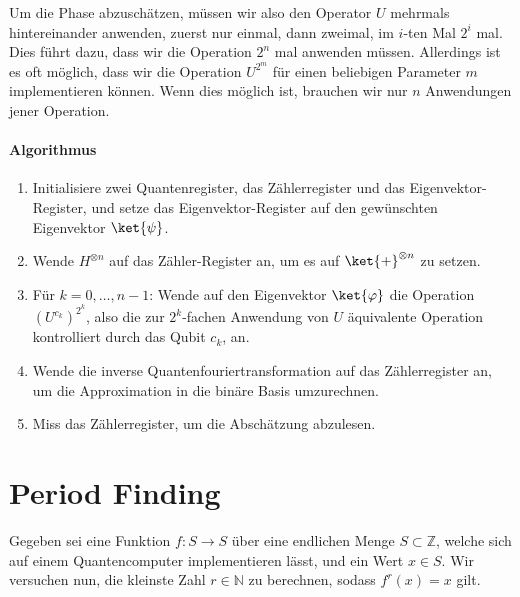 Um die Phase abzuschätzen, müssen wir also den Operator $U$ mehrmals hintereinander anwenden, zuerst nur einmal, dann zweimal, im $i$-ten Mal $2^i$ mal. Dies führt dazu, dass wir die Operation $2^n$ mal anwenden müssen. Allerdings ist es oft möglich, dass wir die Operation $U^{2^m}$ für einen beliebigen Parameter $m$ implementieren können. Wenn dies möglich ist, brauchen wir nur $n$ Anwendungen jener Operation.

\paragraph{Algorithmus}
\begin{enumerate}
    \item Initialisiere zwei Quantenregister, das Zählerregister und das Eigenvektor-Register, und setze das Eigenvektor-Register auf den gewünschten Eigenvektor $\ket{\psi}$.
    \item Wende $H^{\otimes n}$ auf das Zähler-Register an, um es auf $\ket{+}^{\otimes n}$ zu setzen.
    \item Für $k = 0, \dots, n - 1$: Wende auf den Eigenvektor $\ket{\varphi}$ die Operation $(U^{c_k})^{2^k}$, also die zur $2^k$-fachen Anwendung von $U$ äquivalente Operation kontrolliert durch das Qubit $c_k$, an.
    \item Wende die inverse Quantenfouriertransformation auf das Zählerregister an, um die Approximation in die binäre Basis umzurechnen.
    \item Miss das Zählerregister, um die Abschätzung abzulesen.
\end{enumerate}
\paragraph{}

\paragraph{}

\section{Period Finding}
Gegeben sei eine Funktion $f : S \rightarrow S$ über eine endlichen Menge $S \subset \mathbb{Z}$, welche sich auf einem Quantencomputer implementieren lässt, und ein Wert $x \in S$. Wir versuchen nun, die kleinste Zahl $r \in \mathbb{N}$ zu berechnen, sodass $f^r(x) = x$ gilt.
